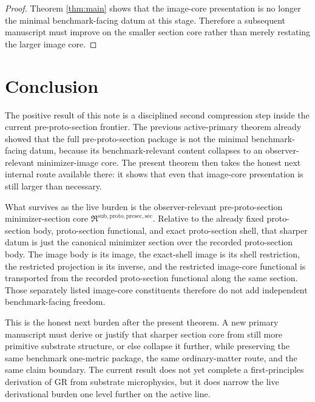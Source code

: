 \documentclass[11pt]{article}
\newcommand{\PreProtoSectionMinSectionCore}{\mathfrak R^{\mathrm{sub,proto,presec,sec}}}
\begin{document}
\begin{proof}
Theorem \ref{thm:main} shows that the image-core presentation is no longer the minimal benchmark-facing datum at this stage. Therefore a subsequent manuscript must improve on the smaller section core rather than merely restating the larger image core.
\end{proof}

\section{Conclusion}

The positive result of this note is a disciplined second compression step inside the current pre-proto-section frontier. The previous active-primary theorem already showed that the full pre-proto-section package is not the minimal benchmark-facing datum, because its benchmark-relevant content collapses to an observer-relevant minimizer-image core. The present theorem then takes the honest next internal route available there: it shows that even that image-core presentation is still larger than necessary.

What survives as the live burden is the observer-relevant pre-proto-section minimizer-section core \(\PreProtoSectionMinSectionCore\). Relative to the already fixed proto-section body, proto-section functional, and exact proto-section shell, that sharper datum is just the canonical minimizer section over the recorded proto-section body. The image body is its image, the exact-shell image is its shell restriction, the restricted projection is its inverse, and the restricted image-core functional is transported from the recorded proto-section functional along the same section. Those separately listed image-core constituents therefore do not add independent benchmark-facing freedom.

This is the honest next burden after the present theorem. A new primary manuscript must derive or justify that sharper section core from still more primitive substrate structure, or else collapse it further, while preserving the same benchmark one-metric package, the same ordinary-matter route, and the same claim boundary. The current result does not yet complete a first-principles derivation of GR from substrate microphysics, but it does narrow the live derivational burden one level further on the active line.
\end{document}
